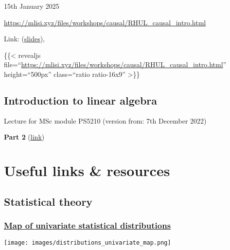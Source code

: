 \documentclass[
]{book}
\begin{document}
15th January 2025

\url{https://mlisi.xyz/files/workshops/causal/RHUL_causal_intro.html}

Link: (\href{https://mlisi.xyz/files/workshops/causal/RHUL_causal_intro.html}{slides}),

\{\{\textless{} revealjs file=``\url{https://mlisi.xyz/files/workshops/causal/RHUL_causal_intro.html}'' height=``500px'' class=``ratio ratio-16x9'' \textgreater\}\}

\section{Introduction to linear algebra}\label{introduction-to-linear-algebra}

Lecture for MSc module PS5210 (version from: 7th December 2022)

\textbf{Part 2} (\href{https://mlisi.xyz/files/workshops/numerical_skills_lecture/slides_numerical_skills_part2.html}{link})

\chapter{Useful links \& resources}\label{useful-links-resources}

\section{Statistical theory}\label{statistical-theory}

\subsection{\texorpdfstring{\href{http://www.math.wm.edu/~leemis/chart/UDR/UDR.html}{Map of univariate statistical distributions}}{Map of univariate statistical distributions}}\label{map-of-univariate-statistical-distributions}

\texttt{[image: images/distributions\_univariate\_map.png]}

  
\end{document}
